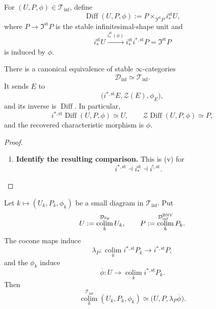 \begin{construction}
\label{con:stable-bnv-differential-function-object}
For \((U,P,\phi)\in\mathcal T_{\inf}\), define
\[
\boxed{
    \operatorname{Diff}(U,P,\phi)
    :=
    P\times_{\Im^{\mathrm{st}}P}i_*^{\mathrm{st}}U,
}
\]
where \(P\to\Im^{\mathrm{st}}P\) is the stable infinitesimal-shape unit and
\[
    i_*^{\mathrm{st}}U
    \xrightarrow{i_*^{\mathrm{st}}(\phi)}
    i_*^{\mathrm{st}}i^{*,\mathrm{st}}P
    =
    \Im^{\mathrm{st}}P
\]
is induced by \(\phi\).
\end{construction}

\begin{theorem}
\label{thm:stable-bnv-characteristic-classification}
There is a canonical equivalence of stable \(\infty\)-categories
\[
\boxed{
    \mathcal D_{\inf}\simeq\mathcal T_{\inf}.
}
\]
It sends \(E\) to
\[
    \bigl(i^{*,\mathrm{st}}E,\mathcal Z(E),\phi_E\bigr),
\]
and its inverse is \(\operatorname{Diff}\). In particular,
\[
    i^{*,\mathrm{st}}\operatorname{Diff}(U,P,\phi)\simeq U,
    \qquad
    \mathcal Z\operatorname{Diff}(U,P,\phi)\simeq P,
\]
and the recovered characteristic morphism is \(\phi\).
\end{theorem}

\begin{proof}
\leavevmode
\begin{enumerate}[label=\textup{(\arabic*)}]
    \item \textbf{Identify the resulting comparison.}
    This is \textup{(v)} for
    \[
        i^{*,\mathrm{st}}\dashv i_*^{\mathrm{st}}\dashv i^{!,\mathrm{st}}.
    \]
\end{enumerate}
\end{proof}

\begin{proposition}
\label{prop:stable-bnv-characteristic-colimits}
Let \(k\mapsto(U_k,P_k,\phi_k)\) be a small diagram in
\(\mathcal T_{\inf}\). Put
\[
    U:=\operatorname*{colim}^{\mathcal D_{\operatorname{Sp}}}_kU_k,
    \qquad
    P:=\operatorname*{colim}^{\mathcal D_{\inf}^{\mathrm{BNV}}}_kP_k.
\]
The cocone maps induce
\[
    \lambda_P:
    \operatorname*{colim}_k i^{*,\mathrm{st}}P_k
    \longrightarrow
    i^{*,\mathrm{st}}P,
\]
and the \(\phi_k\) induce
\[
    \overline\phi:
    U\longrightarrow\operatorname*{colim}_k i^{*,\mathrm{st}}P_k.
\]
Then
\[
    \operatorname*{colim}^{\mathcal T_{\inf}}_k(U_k,P_k,\phi_k)
    \simeq
    \bigl(U,P,\lambda_P\overline\phi\bigr).
\]
\end{proposition}

